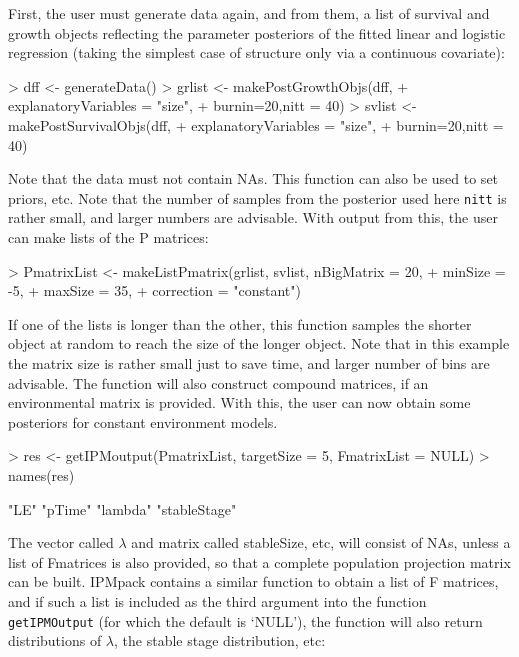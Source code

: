 \documentclass{article}
\begin{document}
First, the user must generate data again, and from them, a list of survival and growth objects reflecting the parameter posteriors of the fitted linear and logistic regression (taking the simplest case of structure only via a continuous covariate):
\begin{Schunk}
\begin{Sinput}
> dff <- generateData()
> grlist <- makePostGrowthObjs(dff, 
+                              explanatoryVariables = "size", 
+                              burnin=20,nitt = 40)
> svlist <- makePostSurvivalObjs(dff, 
+                                explanatoryVariables = "size", 
+                                burnin=20,nitt = 40)
\end{Sinput}
\end{Schunk}
Note that the data must not contain NAs. This function can also be used to set priors, etc. Note that the number of samples from the posterior used here {\tt nitt} is rather small, and larger numbers are advisable. With output from this, the user can make lists of the P matrices:
\begin{Schunk}
\begin{Sinput}
> PmatrixList <- makeListPmatrix(grlist, svlist, nBigMatrix = 20, 
+                                minSize = -5, 
+                                maxSize = 35, 
+                                correction = "constant")
\end{Sinput}
\end{Schunk}
If one of the lists is longer than the other, this function samples the shorter object at random to reach the size of the longer object. Note that in this example the matrix size is rather small just to save time, and larger number of bins are advisable. The function will also construct compound matrices, if an environmental
matrix is provided. With this, the user can now obtain some posteriors for constant environment models. 
\begin{Schunk}
\begin{Sinput}
> res <- getIPMoutput(PmatrixList, targetSize = 5, FmatrixList = NULL)
> names(res)
\end{Sinput}
\begin{Soutput}
[1] "LE"          "pTime"       "lambda"      "stableStage"
\end{Soutput}
\end{Schunk}
The vector called $\lambda$ and matrix called stableSize, etc, will consist of NAs, unless a list of Fmatrices is also provided, so that a complete population projection matrix can be built. IPMpack contains a similar function to obtain a list of F matrices, and if such a list is included as the third argument into the function {\tt getIPMOutput} (for which the default is `NULL'), the function will also return distributions of $\lambda$, the stable stage distribution, etc:  
\end{document}
